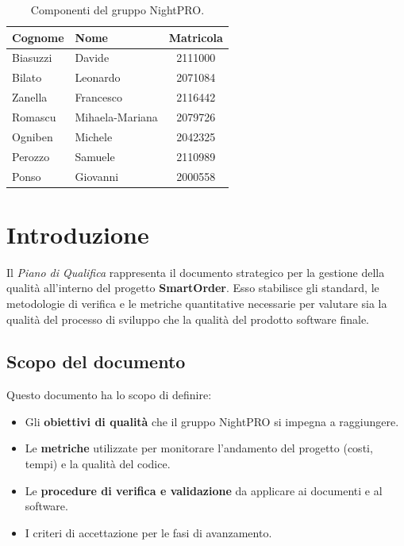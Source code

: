 \documentclass[a4paper,11pt,oneside]{scrartcl}
\begin{document}
\begin{table}[h!]
\centering
\renewcommand{\arraystretch}{1.2}
\begin{tabular}{@{}llc@{}}
\toprule
\textbf{Cognome} & \textbf{Nome} & \textbf{Matricola} \\
\midrule
Biasuzzi & Davide & 2111000 \\
Bilato & Leonardo & 2071084 \\
Zanella & Francesco & 2116442 \\
Romascu & Mihaela-Mariana & 2079726 \\
Ogniben & Michele & 2042325 \\
Perozzo & Samuele & 2110989 \\
Ponso & Giovanni & 2000558 \\
\bottomrule
\end{tabular}
\caption{Componenti del gruppo NightPRO.}
\end{table}

\newpage
\section{Introduzione}

Il \textit{Piano di Qualifica} rappresenta il documento strategico per la gestione della qualità all'interno del progetto \textbf{SmartOrder}. Esso stabilisce gli standard, le metodologie di verifica e le metriche quantitative necessarie per valutare sia la qualità del processo di sviluppo che la qualità del prodotto software finale.

\subsection{Scopo del documento}
Questo documento ha lo scopo di definire:
\begin{itemize}
    \item Gli \textbf{obiettivi di qualità} che il gruppo NightPRO si impegna a raggiungere.
    \item Le \textbf{metriche} utilizzate per monitorare l'andamento del progetto (costi, tempi) e la qualità del codice.
    \item Le \textbf{procedure di verifica e validazione} da applicare ai documenti e al software.
    \item I criteri di accettazione per le fasi di avanzamento.
\end{itemize}
\end{document}
